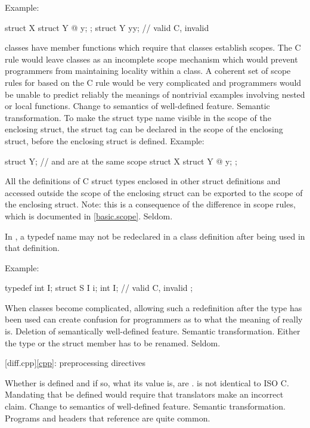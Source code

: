 Example:
\begin{codeblock}
struct X {
  struct Y { @\commentellip@ } y;
};
struct Y yy;                    // valid C, invalid \Cpp{}
\end{codeblock}
\rationale
\Cpp{} classes have member functions which require that classes
establish scopes.
The C rule would leave classes as an incomplete scope mechanism
which would prevent \Cpp{} programmers from maintaining locality
within a class.
A coherent set of scope rules for \Cpp{} based on the C rule would
be very complicated and \Cpp{} programmers would be unable to predict
reliably the meanings of nontrivial examples involving nested or
local functions.
\effect
Change to semantics of well-defined feature.
\difficulty
Semantic transformation.
To make the struct type name visible in the scope of the enclosing
struct, the struct tag can be declared in the scope of the
enclosing struct, before the enclosing struct is defined.
Example:
\begin{codeblock}
struct Y;                       //  and  are at the same scope
struct X {
  struct Y { @\commentellip@ } y;
};
\end{codeblock}

All the definitions of C struct types enclosed in other struct
definitions and accessed outside the scope of the enclosing
struct can be exported to the scope of the enclosing struct.
Note: this is a consequence of the difference in scope rules,
which is documented in \ref{basic.scope}.
\howwide
Seldom.

\change
In \Cpp{}, a typedef name may not be redeclared in a class definition after being used in that definition.

Example:
\begin{codeblock}
typedef int I;
struct S {
  I i;
  int I;            // valid C, invalid \Cpp{}
};
\end{codeblock}
\rationale
When classes become complicated, allowing such a redefinition
after the type has been used can create confusion for \Cpp{}
programmers as to what the meaning of  really is.
\effect
Deletion of semantically well-defined feature.
\difficulty
Semantic transformation.
Either the type or the struct member has to be renamed.
\howwide
Seldom.

[diff.cpp]{\ref{cpp}: preprocessing directives}

\change
Whether  is defined and if so, what its value is, are
.
\rationale
\Cpp{} is not identical to ISO C\@.
Mandating that 
be defined would require that translators make an incorrect claim.
\effect
Change to semantics of well-defined feature.
\difficulty
Semantic transformation.
\howwide
Programs and headers that reference  are
quite common.


